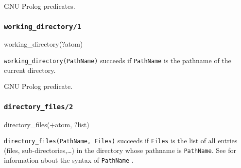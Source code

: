 \Portability

GNU Prolog predicates.

\subsubsection{\texttt{working\_directory/1}}

\begin{TemplatesOneCol}
working\_directory(?atom)

\end{TemplatesOneCol}

\Description

\texttt{working\_directory(PathName)} succeeds if \texttt{PathName} is the
pathname of the current directory. 

\begin{PlErrors}


\end{PlErrors}

\Portability

GNU Prolog predicate.

\subsubsection{\texttt{directory\_files/2}}

\begin{TemplatesOneCol}
directory\_files(+atom, ?list)

\end{TemplatesOneCol}

\Description

\texttt{directory\_files(PathName, Files)} succeeds if \texttt{Files} is the
list of all entries (files, sub-directories,\ldots) in the directory whose
pathname is \texttt{PathName}. See  for
information about the syntax of \texttt{PathName}
.

\begin{PlErrors}






\end{PlErrors}

